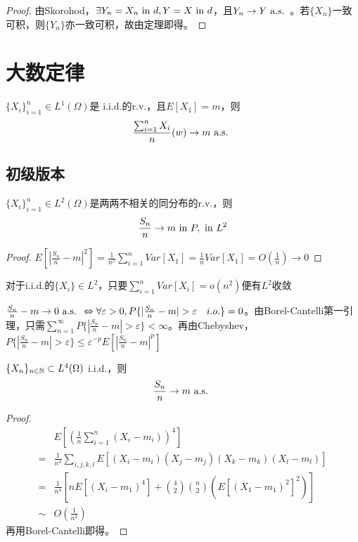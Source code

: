 \documentclass{ctexbook}
\begin{document}
\begin{proof}
  由Skorohod，$\exists Y_{n}=X_{n}\text{ in } d, Y=X\text{ in } d$，且$Y_{n}\to Y\text{ a.s. }$。若$\{X_{n}\}$一致可积，则$\{Y_{n}\}$亦一致可积，故由定理即得。
\end{proof}
\chapter{大数定律}
\begin{Thm}[大数定律]
$\{X_{i}\}_{i=1}^{n}\in L^{1}(\Omega)$是 i.i.d.的r.v.，且$E[X_{1}]=m$，则
\[\frac{\sum_{i=1}^{n}X_{i}}{n}(w)\to m\text{ a.s. }\]
\end{Thm}
\section{初级版本}
\begin{Eg}
  $\{X_{i}\}_{i=1}^{n}\in L^{2}(\Omega)$是两两不相关的同分布的r.v.，则
  \[\frac{S_{n}}{n}\to m\text{ in } P,\text{ in } L^{2}\]
\end{Eg}

\begin{proof}
  $E[|\frac{S_{n}}{n}-m|^{2}]=\frac{1}{n^{2}}\sum_{i=1}^{n}Var[X_{1}]=\frac{1}{n}Var[X_{1}]=O(\frac{1}{n})\to 0$
\end{proof}

\begin{Rmk}
  对于i.i.d.的$\{X_{i}\}\in L^{2}$，只要$\sum_{i=1}^{n}Var[X_{i}]=o(n^{2})$便有$L^{2}$收敛
\end{Rmk}

$\frac{S_{n}}{n}-m\to 0\alsu\Leftrightarrow \forall\varepsilon>0, P\{|\frac{S_{n}}{n}-m|>\varepsilon\quad i.o.\}=0$。由Borel-Cantelli第一引理，只需$\sum_{n=1}^{\infty}P\{|\frac{S_{n}}{n}-m|>\varepsilon\}<\infty$。再由Chebyshev，$P\{|\frac{S_{n}}{n}-m|>\varepsilon\}\leq\varepsilon^{-p}E[|\frac{S_{n}}{n}-m|^{p}]$

\begin{Eg}
  $\{X_{n}\}_{n\in\mathbb{N}}\subset L^{4}(\Omega)$ i.i.d.，则
  \[\frac{S_{n}}{n}\to m\text{ a.s. }\]
\end{Eg}

\begin{proof}
\begin{align*}
  &E[(\frac{1}{n}\sum_{i=1}^{n}(X_{i}-m_{i}))^{4}]\\
  =&\frac{1}{n^{4}}\sum_{i,j,k,l}E[(X_{i}-m_{i})(X_{j}-m_{j})(X_{k}-m_{k})(X_{l}-m_{l})]\\
  =&\frac{1}{n^{4}}[nE[(X_{i}-m_{1})^{4}]+\binom{4}{2}\binom{n}{2}(E[(X_{1}-m_{1})^{2}]^{2})]\\
  \sim& O(\frac{1}{n^{2}})
\end{align*}
  再用Borel-Cantelli即得。
\end{proof}
\end{document}

